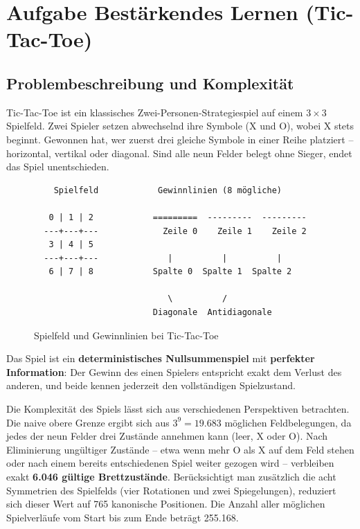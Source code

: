
\chapter{Aufgabe Bestärkendes Lernen (Tic-Tac-Toe)}

\section{Problembeschreibung und Komplexität}

Tic-Tac-Toe ist ein klassisches Zwei-Personen-Strategiespiel auf einem $3 \times 3$ Spielfeld. Zwei Spieler setzen abwechselnd ihre Symbole (X und O), wobei X stets beginnt. Gewonnen hat, wer zuerst drei gleiche Symbole in einer Reihe platziert -- horizontal, vertikal oder diagonal. Sind alle neun Felder belegt ohne Sieger, endet das Spiel unentschieden.

\begin{figure}[H]
\centering
\begin{verbatim}
    Spielfeld            Gewinnlinien (8 mögliche)
                    
   0 | 1 | 2            =========  ---------  ---------
  ---+---+---             Zeile 0    Zeile 1    Zeile 2
   3 | 4 | 5            
  ---+---+---              |          |          |
   6 | 7 | 8            Spalte 0  Spalte 1  Spalte 2
                    
                           \          /
                        Diagonale  Antidiagonale
\end{verbatim}
\caption{Spielfeld und Gewinnlinien bei Tic-Tac-Toe}
\end{figure}

Das Spiel ist ein \textbf{deterministisches Nullsummenspiel} mit \textbf{perfekter Information}: Der Gewinn des einen Spielers entspricht exakt dem Verlust des anderen, und beide kennen jederzeit den vollständigen Spielzustand.

Die Komplexität des Spiels lässt sich aus verschiedenen Perspektiven betrachten. Die naive obere Grenze ergibt sich aus $3^9 = 19.683$ möglichen Feldbelegungen, da jedes der neun Felder drei Zustände annehmen kann (leer, X oder O). Nach Eliminierung ungültiger Zustände -- etwa wenn mehr O als X auf dem Feld stehen oder nach einem bereits entschiedenen Spiel weiter gezogen wird -- verbleiben exakt \textbf{6.046 gültige Brettzustände}. Berücksichtigt man zusätzlich die acht Symmetrien des Spielfelds (vier Rotationen und zwei Spiegelungen), reduziert sich dieser Wert auf 765 kanonische Positionen. Die Anzahl aller möglichen Spielverläufe vom Start bis zum Ende beträgt 255.168.

